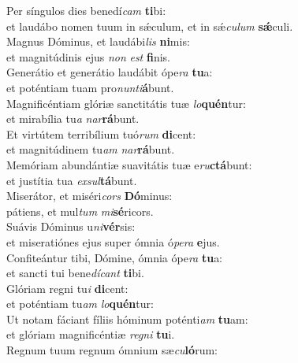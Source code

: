 \evenverse Per síngulos dies benedí\textit{cam} \textbf{ti}bi:~\*\\
\evenverse et laudábo nomen tuum in sǽculum, et in sǽ\textit{cu}\textit{lum} \textbf{sǽ}culi.\\
\oddverse Magnus Dóminus, et laudábi\textit{lis} \textbf{ni}mis:~\*\\
\oddverse et magnitúdinis ejus \textit{non} \textit{est} \textbf{fi}nis.\\
\evenverse Generátio et generátio laudábit ópe\textit{ra} \textbf{tu}a:~\*\\
\evenverse et poténtiam tuam pro\textit{nun}\textit{ti}\textbf{á}bunt.\\
\oddverse Magnificéntiam glóriæ sanctitátis tuæ \textit{lo}\textbf{quén}tur:~\*\\
\oddverse et mirabília tu\textit{a} \textit{nar}\textbf{rá}bunt.\\
\evenverse Et virtútem terribílium tuó\textit{rum} \textbf{di}cent:~\*\\
\evenverse et magnitúdinem tu\textit{am} \textit{nar}\textbf{rá}bunt.\\
\oddverse Memóriam abundántiæ suavitátis tuæ e\textit{ru}\textbf{ctá}bunt:~\*\\
\oddverse et justítia tua \textit{ex}\textit{sul}\textbf{tá}bunt.\\
\evenverse Miserátor, et miséri\textit{cors} \textbf{Dó}minus:~\*\\
\evenverse pátiens, et mul\textit{tum} \textit{mi}\textbf{sé}ricors.\\
\oddverse Suávis Dóminus u\textit{ni}\textbf{vér}sis:~\*\\
\oddverse et miseratiónes ejus super ómnia ó\textit{pe}\textit{ra} \textbf{e}jus.\\
\evenverse Confiteántur tibi, Dómine, ómnia ópe\textit{ra} \textbf{tu}a:~\*\\
\evenverse et sancti tui bene\textit{dí}\textit{cant} \textbf{ti}bi.\\
\oddverse Glóriam regni tu\textit{i} \textbf{di}cent:~\*\\
\oddverse et poténtiam tu\textit{am} \textit{lo}\textbf{quén}tur:\\
\evenverse Ut notam fáciant fíliis hóminum poténti\textit{am} \textbf{tu}am:~\*\\
\evenverse et glóriam magnificéntiæ \textit{re}\textit{gni} \textbf{tu}i.\\
\oddverse Regnum tuum regnum ómnium sæ\textit{cu}\textbf{ló}rum:~\*\\
